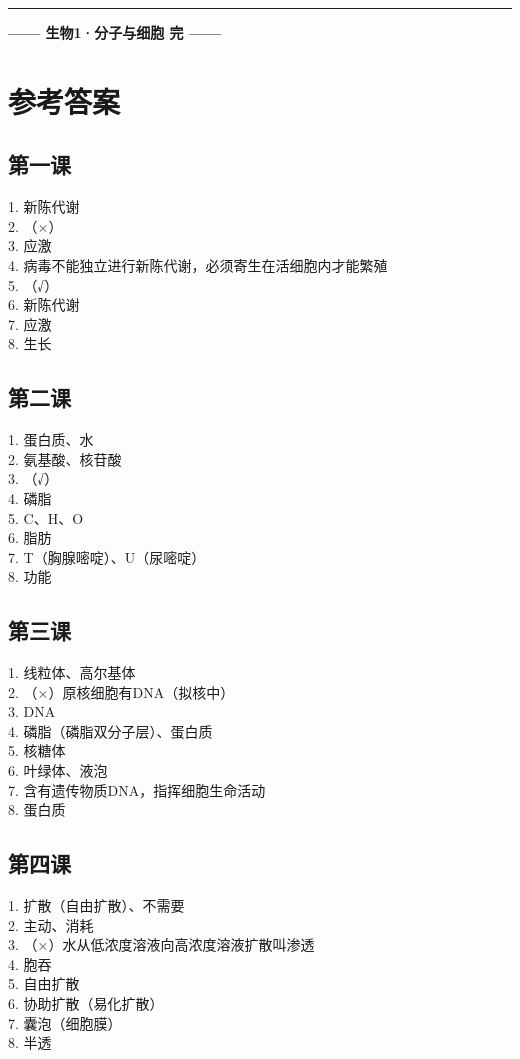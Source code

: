\documentclass[a4paper,12pt]{ctexart}
\begin{document}
\vspace{0.5cm}
\begin{center}\rule{0.7\textwidth}{1pt}\vspace{0.4cm}
{\large\textcolor{blue!70!black}{\textbf{—— 生物1·分子与细胞 完 ——}}}
\end{center}

\newpage
\section*{\textcolor{defblue}{参考答案}}

\subsection*{第一课}
1. 新陈代谢\\
2. （×）\\
3. 应激\\
4. 病毒不能独立进行新陈代谢，必须寄生在活细胞内才能繁殖\\
5. （√）\\
6. 新陈代谢\\
7. 应激\\
8. 生长

\subsection*{第二课}
1. 蛋白质、水\\
2. 氨基酸、核苷酸\\
3. （√）\\
4. 磷脂\\
5. C、H、O\\
6. 脂肪\\
7. T（胸腺嘧啶）、U（尿嘧啶）\\
8. 功能

\subsection*{第三课}
1. 线粒体、高尔基体\\
2. （×）原核细胞有DNA（拟核中）\\
3. DNA\\
4. 磷脂（磷脂双分子层）、蛋白质\\
5. 核糖体\\
6. 叶绿体、液泡\\
7. 含有遗传物质DNA，指挥细胞生命活动\\
8. 蛋白质

\subsection*{第四课}
1. 扩散（自由扩散）、不需要\\
2. 主动、消耗\\
3. （×）水从低浓度溶液向高浓度溶液扩散叫渗透\\
4. 胞吞\\
5. 自由扩散\\
6. 协助扩散（易化扩散）\\
7. 囊泡（细胞膜）\\
8. 半透
\end{document}
